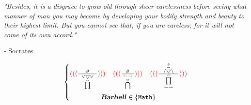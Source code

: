 \documentclass[footheight=20pt, footsepline, headheight=20pt, headsepline]{book}
\begin{document}
\newpage
\thispagestyle{empty}

\vspace*{\fill}
\textit{"Besides, it is a disgrace to grow old through sheer carelessness before seeing what manner of man you may become by developing your bodily strength and beauty to their highest limit. But you cannot see that, if you are careless; for it will not come of its own accord."}\\
\begin{center}
    - Socrates
\end{center}
\vspace*{\fill}

\begin{figure*}[b]
\begin{equation*}
	\left\{\begin{matrix}
		{\color{red}(((}
		\frac{
			\;\;\;\;\;
			\theta
			\;\;\;\;\;
		}{
			\underset{
				\widehat{\prod}
			}{
				\vee\bigtriangledown\vee
			}
		}
		{\color{red})))}
		
		\;\;\;\;
		
		{\color{red}(((}
		\frac{
			\;\;\;
			\theta
			\;\;\;
		}{
			\bigcap 
			\limits^{
				\overset{\leftharpoonup \rightharpoonup }
				{\bigtriangledown_{}}}_{}  
		}
		{\color{red})))}
		
		\;\;\;\;

		{\color{red} (((}
		\frac{
			\;\;\; 
			/\overset{\theta}{\widehat{\bigtriangledown}} \setminus  
			\;\;\;
		}{
			{\prod\limits_{\leftharpoonup \rightharpoonup}^{\frown} }
		}
		{\color{red})))}
	 	\\
	 	\textbf{\textsl{Barbell}} \in \{ \texttt{\textbf{Math}} \}
	\end{matrix}\right.
\end{equation*}
\end{figure*}
\end{document}
